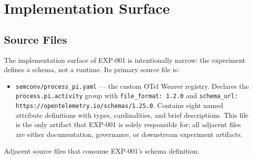 
\section{Implementation Surface}
\label{sec:otel-weaver-exp-001-custom-pi-registry-implementation}

\subsection{Source Files}
\label{sec:otel-weaver-exp-001-custom-pi-registry-implementation-sources}

The implementation surface of EXP-001 is intentionally narrow: the experiment defines a schema,
not a runtime. Its primary source file is:

\begin{itemize}
  \item \texttt{semconv/process\_pi.yaml} --- the custom OTel Weaver registry. Declares the
        \texttt{process.pi.activity} group with \texttt{file\_format: 1.2.0} and
        \texttt{schema\_url: https://opentelemetry.io/schemas/1.25.0}. Contains eight named
        attribute definitions with types, cardinalities, and brief descriptions. This file is the
        only artifact that EXP-001 is solely responsible for; all adjacent files are either
        documentation, governance, or downstream experiment artifacts.
\end{itemize}

Adjacent source files that consume EXP-001's schema definition:

